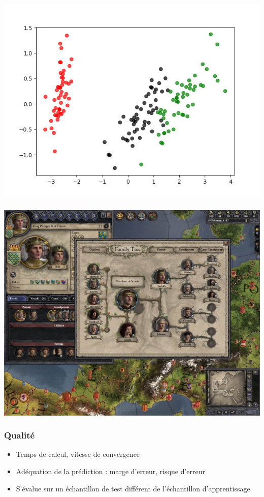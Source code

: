 \documentclass[11pt]{beamer}
\newenvironment{slide}[1]{%
\begin{frame}[environment=slide]
\frametitle{#1}
}{%
\end{frame}
}
\begin{document}
\begin{slide}{}

\includegraphics[scale=0.5]{A8classif}

\end{slide}

\begin{slide}{}

\includegraphics[scale=0.25]{A9videogames}

\end{slide}

\begin{slide}{Qualité}

\begin{itemize}
	\item Temps de calcul, vitesse de convergence
	\item Adéquation de la prédiction : marge d'erreur, risque d'erreur
	\item S'évalue sur un échantillon de test différent de l'échantillon d'apprentissage
\end{itemize}

\end{slide}
\end{document}

